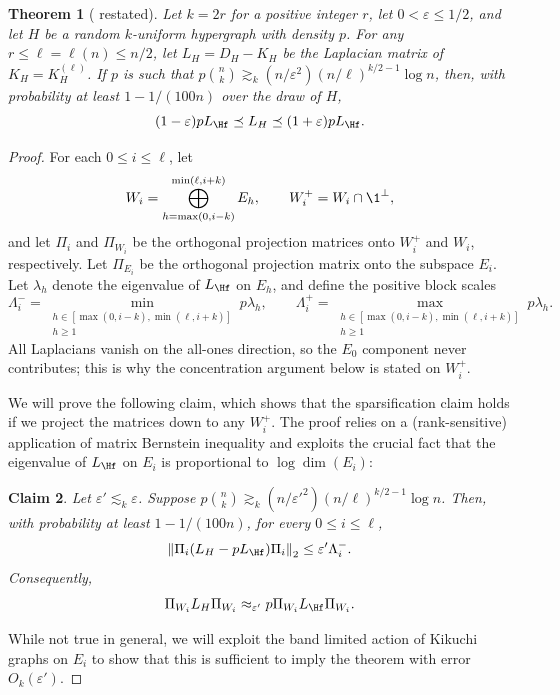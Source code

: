 \documentclass
[11pt,letterpaper]
{article}
\renewcommand{\epsilon}{\varepsilon}
\newtheorem{theorem}{Theorem}[section]
\newtheorem{claim}[theorem]{Claim}
\begin{document}
\begin{theorem} [ restated] \label{thm:main-restated}
Let $k=2r$ for a positive integer $r$, let $0<\epsilon\leq 1/2$, and let $H$ be a random $k$-uniform hypergraph with density $p$. For any $r\leq\ell = \ell(n) \leq n/2$, let $L_H = D_H - K_H$ be the Laplacian matrix of $K_H = K_H^{(\ell)}$. If $p$ is such that $p {n\choose k} \gtrsim_k (n/\epsilon^2) (n/\ell)^{k/2-1}\log n$, then, with probability at least $1-1/(100n)$ over the draw of $H$, 
\[
(1-\epsilon) p L_{\Hf} \preceq L_{H} \preceq (1+\epsilon) p L_{\Hf}.
\]
\end{theorem}
\begin{proof}
For each $0 \leq i \leq \ell$, let
\[
W_i=\bigoplus_{h=\max(0,i-k)}^{\min(\ell,i+k)}E_h,
\qquad
W_i^+=W_i\cap \1^\perp,
\]
and let $\Pi_i$ and $\Pi_{W_i}$ be the orthogonal projection matrices onto $W_i^+$ and $W_i$, respectively. Let $\Pi_{E_i}$ be the orthogonal projection matrix onto the subspace $E_i$. Let $\lambda_h$ denote the eigenvalue of $L_{\Hf}$ on $E_h$, and define the positive block scales
\[
\Lambda_i^-=\min_{\substack{h\in[\max(0,i-k),\min(\ell,i+k)]\\ h\geq 1}}p\lambda_h,
\qquad
\Lambda_i^+=\max_{\substack{h\in[\max(0,i-k),\min(\ell,i+k)]\\ h\geq 1}}p\lambda_h.
\]
All Laplacians vanish on the all-ones direction, so the $E_0$ component never contributes; this is why the concentration argument below is stated on $W_i^+$.

We will prove the following claim, which shows that the sparsification claim holds if we project the matrices down to any $W_i^+$. The proof relies on a (rank-sensitive) application of matrix Bernstein inequality and exploits the crucial fact that the eigenvalue of $L_{\Hf}$ on $E_i$ is proportional to $\log \dim(E_i)$:

\begin{claim} \label{claim:subspace-bernstein-even}
Let $\epsilon' \lesssim_k \epsilon$. Suppose $p{n\choose k} \gtrsim_k (n/\epsilon'^2) (n/\ell)^{k/2-1} \log n$. Then, with probability at least $1-1/(100n)$, for every $0\leq i\leq \ell$,
\[
\left\|\Pi_i(L_H-pL_{\Hf})\Pi_i\right\|_2\leq \epsilon'\Lambda_i^-.
\]
Consequently,
\[
\Pi_{W_i} L_H \Pi_{W_i}  \approx_{\epsilon'} p\Pi_{W_i}L_{\Hf}\Pi_{W_i}.
\]
\end{claim}
While not true in general, we will exploit the band limited action of Kikuchi graphs on $E_i$ to show that this is sufficient to imply the theorem with error $O_k(\epsilon')$.


\end{proof}
\end{document}

